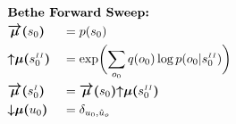 \documentclass[fleqn]{article}
\begin{document}
\noindent
\setlength{\jot}{0.6em}
\begin{minipage}[t]{0.5\textwidth}
    \begin{alignat}{2}
         & \rlap{\text{\bfseries Bethe Forward Sweep:}} \nonumber                                                                                                                                                                                                                                                                                                                                                                                                                                                                          \\
         & \bm{\overrightarrow{\mu}(}s_0\bm{)}                                                                                                                                                                                                                                                                                                           &  & = p(s_0)                                                                                                                                                                     \\
         & \bm{{\uparrow}{\mu}(}s^{\scriptscriptstyle II}_0\bm{)}                                                                                                                                                                                                                                                                                        &  & = \exp \biggl(\sum_{o_0} q(o_0)\log p(o_0|s^{\scriptscriptstyle II}_0)\biggr)                                                                                                \\
         & \bm{\overrightarrow{\mu}(}s^{\scriptscriptstyle I}_0\bm{)}                                                                                                                                                                                                                                                                                    &  & = \bm{\overrightarrow{\mu}(}s_0\bm{)} \bm{{\uparrow}{\mu}(}s^{\scriptscriptstyle II}_0\bm{)}                                                                                 \\
         & \bm{{\downarrow}{\mu}(}u_0\bm{)}                                                                                                                                                                                                                                                                                                              &  & = \delta_{u_0,\hat{u}_o}                                                                                                                                                     \\

\end{alignat}
\end{minipage}
\end{document}
